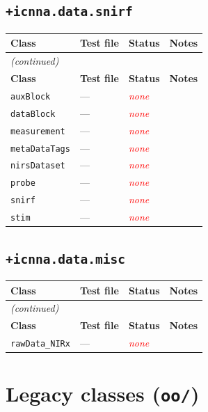 \documentclass[11pt,a4paper]{article}
\newcommand{\statusNone}{\textcolor{red}{\textit{none}}}
\begin{document}
\subsection{\texttt{+icnna.data.snirf}}

\begin{longtable}{llll}
\toprule
\textbf{Class} & \textbf{Test file} & \textbf{Status} & \textbf{Notes} \\
\midrule
\endfirsthead
\multicolumn{4}{l}{\small\itshape (continued)} \\
\toprule
\textbf{Class} & \textbf{Test file} & \textbf{Status} & \textbf{Notes} \\
\midrule
\endhead
\bottomrule
\endfoot
\texttt{auxBlock}     & --- & \statusNone & \\
\texttt{dataBlock}    & --- & \statusNone & \\
\texttt{measurement}  & --- & \statusNone & \\
\texttt{metaDataTags} & --- & \statusNone & \\
\texttt{nirsDataset}  & --- & \statusNone & \\
\texttt{probe}        & --- & \statusNone & \\
\texttt{snirf}        & --- & \statusNone & \\
\texttt{stim}         & --- & \statusNone & \\
\end{longtable}

\subsection{\texttt{+icnna.data.misc}}

\begin{longtable}{llll}
\toprule
\textbf{Class} & \textbf{Test file} & \textbf{Status} & \textbf{Notes} \\
\midrule
\endfirsthead
\multicolumn{4}{l}{\small\itshape (continued)} \\
\toprule
\textbf{Class} & \textbf{Test file} & \textbf{Status} & \textbf{Notes} \\
\midrule
\endhead
\bottomrule
\endfoot
\texttt{rawData\_NIRx} & --- & \statusNone & \\
\end{longtable}

\section{Legacy classes (\texttt{oo/})}
\end{document}
